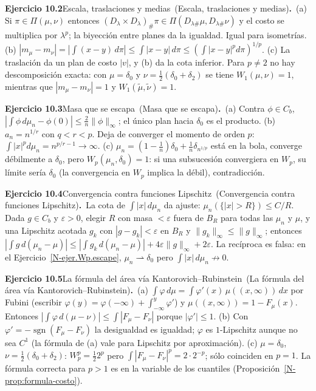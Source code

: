 \documentclass[11pt,a4paper]{amsart}
\newcommand{\ve}{\varepsilon}
\theoremstyle{remark}
\theoremstyle{definition}
\numberwithin{subsection}{section}
\numberwithin{equation}{section}
\newcommand{\ejlabel}[2]{\par\medskip\noindent\textbf{Ejercicio #1}\ifx\relax#2\relax\else\ (#2)\fi\textbf{.}\ }
\begin{document}
\ejlabel{10.2}{Escala, traslaciones y medias}(a) Si $\pi\in\Pi(\mu,\nu)$ entonces $(D_\lambda\times D_\lambda)_\#\pi\in\Pi(D_{\lambda\#}\mu,D_{\lambda\#}\nu)$ y el costo se multiplica por $\lambda^p$; la biyección entre planes da la igualdad. Igual para isometrías. (b) $|m_\mu-m_\nu|=|\int(x-y)\,d\pi|\le\int|x-y|\,d\pi\le(\int|x-y|^pd\pi)^{1/p}$. (c) La traslación da un plan de costo $|v|$, y (b) da la cota inferior. Para $p\ne2$ no hay descomposición exacta: con $\mu=\delta_0$ y $\nu=\frac12(\delta_0+\delta_2)$ se tiene $W_1(\mu,\nu)=1$, mientras que $|m_\mu-m_\nu|=1$ y $W_1(\tilde\mu,\tilde\nu)=1$.

\ejlabel{10.3}{Masa que se escapa}(a) Contra $\phi\in C_b$, $|\int\phi\,d\mu_n-\phi(0)|\le\frac2n\|\phi\|_\infty$; el único plan hacia $\delta_0$ es el producto. (b) $a_n=n^{1/r}$ con $q<r<p$. Deja de converger el momento de orden $p$: $\int|x|^pd\mu_n=n^{p/r-1}\to\infty$. (c) $\mu_n=(1-\frac1n)\delta_0+\frac1n\delta_{n^{1/p}}$ está en la bola, converge débilmente a $\delta_0$, pero $W_p(\mu_n,\delta_0)=1$: si una subsucesión convergiera en $W_p$, su límite sería $\delta_0$ (la convergencia en $W_p$ implica la débil), contradicción.

\ejlabel{10.4}{Convergencia contra funciones Lipschitz}La cota de $\int|x|\,d\mu_n$ da ajuste: $\mu_n(\{|x|>R\})\le C/R$. Dada $g\in C_b$ y $\ve>0$, elegir $R$ con masa $<\ve$ fuera de $B_R$ para todas las $\mu_n$ y $\mu$, y una Lipschitz acotada $g_k$ con $|g-g_k|<\ve$ en $B_R$ y $\|g_k\|_\infty\le\|g\|_\infty$; entonces $|\int g\,d(\mu_n-\mu)|\le|\int g_k\,d(\mu_n-\mu)|+4\ve\|g\|_\infty+2\ve$. La recíproca es falsa: en el Ejercicio~\ref{N-ejer.Wp.escape}, $\mu_n\rightharpoonup\delta_0$ pero $\int|x|\,d\mu_n\not\to0$.

\ejlabel{10.5}{La fórmula del área vía Kantorovich--Rubinstein}(a) $\int\varphi\,d\mu=\int\varphi'(x)\,\mu((x,\infty))\,dx$ por Fubini (escribir $\varphi(y)=\varphi(-\infty)+\int_{-\infty}^y\varphi'$) y $\mu((x,\infty))=1-F_\mu(x)$. Entonces $|\int\varphi\,d(\mu-\nu)|\le\int|F_\mu-F_\nu|$ porque $|\varphi'|\le1$. (b) Con $\varphi'=-\operatorname{sgn}(F_\mu-F_\nu)$ la desigualdad es igualdad; $\varphi$ es $1$-Lipschitz aunque no sea $C^1$ (la fórmula de (a) vale para Lipschitz por aproximación). (c) $\mu=\delta_0$, $\nu=\frac12(\delta_0+\delta_2)$: $W_p^p=\frac122^p$ pero $\int|F_\mu-F_\nu|^p=2\cdot2^{-p}$; sólo coinciden en $p=1$. La fórmula correcta para $p>1$ es en la variable de los cuantiles (Proposición~\ref{N-prop:formula-costo}).
\end{document}

